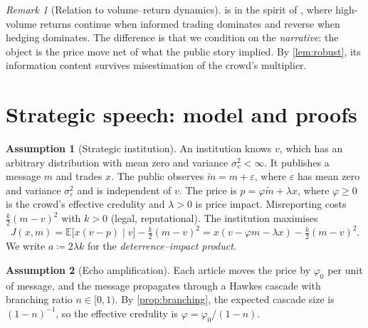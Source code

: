 \documentclass{article}
\theoremstyle{plain}
\theoremstyle{definition}
\newtheorem{assumption}{Assumption}
\theoremstyle{remark}
\newtheorem{remark}[theorem]{Remark}
\newcommand{\E}{\mathbb{E}}
\begin{document}
\begin{remark}[Relation to volume--return dynamics]
 is in the spirit of \citet{llorente2002}, where high-volume returns continue when informed trading dominates and reverse when hedging dominates. The difference is that we condition on the \emph{narrative}: the object is the price move net of what the public story implied. By \cref{lem:robust}, its information content survives misestimation of the crowd's multiplier.
\end{remark}

\section{Strategic speech: model and proofs}\label{app:strategic}

\begin{assumption}[Strategic institution]\label{ass:strategic}
An institution knows $v$, which has an arbitrary distribution with mean zero and variance $\sigma_v^2<\infty$. It publishes a message $m$ and trades $x$. The public observes $\tilde m=m+\varepsilon$, where $\varepsilon$ has mean zero and variance $\sigma_\varepsilon^2$ and is independent of $v$. The price is $p=\varphi\tilde m+\lambda x$, where $\varphi\ge0$ is the crowd's effective credulity and $\lambda>0$ is price impact. Misreporting costs $\tfrac k2(m-v)^2$ with $k>0$ (legal, reputational). The institution maximises
\[
  J(x,m)=\E\big[x(v-p)\mid v\big]-\tfrac k2(m-v)^2=x(v-\varphi m-\lambda x)-\tfrac k2(m-v)^2 .
\]
We write $a\coloneqq2\lambda k$ for the \emph{deterrence--impact product}.
\end{assumption}
\begin{assumption}[Echo amplification]\label{ass:amplify}
Each article moves the price by $\varphi_0$ per unit of message, and the message propagates through a Hawkes cascade with branching ratio $n\in[0,1)$. By \cref{prop:branching}, the expected cascade size is $(1-n)^{-1}$, so the effective credulity is $\varphi=\varphi_0/(1-n)$.
\end{assumption}
\end{document}
